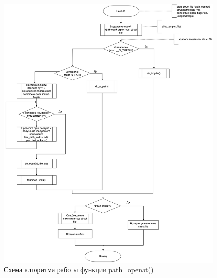 \begin{figure}[h!]
	\begin{center}
		\includegraphics[width=\textwidth]{images/path_openat}
	\end{center}
	\caption{Схема алгоритма работы функции path\_openat()}
	\label{img:openat}
\end{figure}

